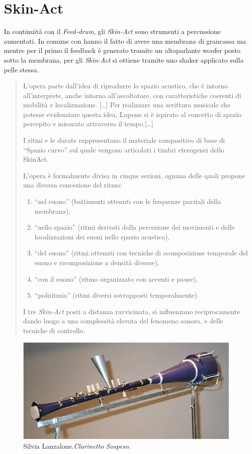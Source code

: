 \section{Skin-Act}

In continuità con il \emph{Feed-drum}, gli \emph{Skin-Act} sono strumenti a percussione aumentati. In comune con hanno il fatto di avere una membrana di grancassa ma
mentre per il primo il feedback è generato tramite un altoparlante woofer posto
sotto la membrana, per gli \emph{Skin-Act} si ottiene tramite uno shaker applicato
sulla pelle stessa.

\begin{quote}
L’opera parte dall’idea di riprodurre lo spazio acustico, che è intorno
all’interprete, anche intorno all’ascoltatore, con caratteristiche coerenti di
mobilità e localizzazione. [\ldots]
Per realizzare una scrittura musicale che potesse evidenziare questa idea,
Lupone si è ispirato al concetto di spazio percepito e misurato attraverso il
tempo.[\ldots]

I ritmi e le durate rappresentano il materiale compositivo di base di
“Spazio curvo” sul quale vengono articolati i timbri eterogenei dello SkinAct.

L’opera è formalmente divisa in cinque sezioni, ognuna delle quali propone una
diversa concezione del ritmo:
\begin{enumerate}
  \item “nel suono” (battimenti ottenuti con le frequenze parziali della membrana),
  \item “nello spazio” (ritmi derivati dalla percezione dei movimenti e delle
localizzazioni dei suoni nello spazio acustico),
  \item“del suono” (ritmi ottenuti con tecniche di scomposizione temporale del
suono e ricomposizione a densità diverse),
  \item“con il suono” (ritmo organizzato con accenti e pause),
  \item“poliritmia” (ritmi diversi sovrapposti temporalmente).
\end{enumerate}

I tre \emph{Skin-Act} posti a distanza ravvicinata, si influenzano reciprocamente dando
luogo a una complessità elevata del fenomeno sonoro, e delle tecniche di
controllo.
\end{quote}

\begin{figure}%
\centering
\includegraphics[width=0.99\columnwidth]{Graphics/foto/clarinetto_sospeso.PNG}
\caption[]{Silvia Lanzalone.\emph{Clarinetto Sospeso}.}
\label{clarinetto}
\end{figure}

